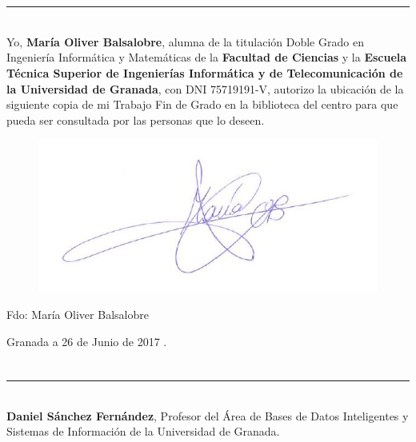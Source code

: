 \chapter*{}
\thispagestyle{empty}

\noindent\rule[-1ex]{\textwidth}{2pt}\\[4.5ex]

Yo, \textbf{María Oliver Balsalobre}, alumna de la titulación Doble Grado en Ingeniería Informática y Matemáticas de la \textbf{Facultad de Ciencias} y la \textbf{Escuela Técnica Superior de Ingenierías Informática y de Telecomunicación de la Universidad de Granada}, con DNI 75719191-V, autorizo la ubicación de la siguiente copia de mi Trabajo Fin de Grado en la biblioteca del centro para que pueda ser consultada por las personas que lo deseen.
\begin{figure}  [H]
    \centering
    \includegraphics[scale=0.5]{imagenes/firmaMaria.JPG}
\end{figure}
\vspace{3cm}

\noindent Fdo: María Oliver Balsalobre

\vspace{2cm}

\begin{flushright}
Granada a 26 de Junio de 2017 .
\end{flushright}


\chapter*{}
\thispagestyle{empty}

\noindent\rule[-1ex]{\textwidth}{2pt}\\[4.5ex]

\textbf{Daniel Sánchez Fernández}, Profesor del Área de Bases de Datos Inteligentes y Sistemas de Información de la Universidad de Granada.

\vspace{0.5cm}

